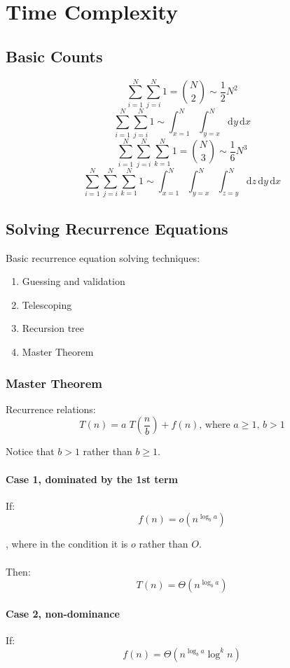 \chapter{Time Complexity}

\section{Basic Counts}
$$
\sum_{i=1}^N{\sum_{j=i}^N{1}} = {N \choose 2} \sim \frac{1}{2} N^2
$$
$$
\sum_{i=1}^N{\sum_{j=i}^N{1}} \sim \int_{x=1}^N \int_{y=x}^N  \mathrm{d}y\, \mathrm{d}x
$$
$$
\sum_{i=1}^N{\sum_{j=i}^N{\sum_{k=1}^N{1}}} = {N \choose 3} \sim \frac{1}{6} N^3
$$
$$
\sum_{i=1}^N{\sum_{j=i}^N{\sum_{k=1}^N{1}}} \sim \int_{x=1}^N \int_{y=x}^N \int_{z=y}^N \mathrm{d}z\,
\mathrm{d}y\, \mathrm{d}x
$$

\section{Solving Recurrence Equations}
Basic recurrence equation solving techniques:
\begin{enumerate}
\item Guessing and validation
\item Telescoping
\item Recursion tree
\item Master Theorem
\end{enumerate}

\subsection{Master Theorem}
Recurrence relations:
$$T(n) = a \; T\!\left(\frac{n}{b}\right) + f(n)\mbox{, where }a \geq 1 \mbox{, } b > 1$$

Notice that $b>1$ rather than $b\geq1$.

\subsubsection*{Case 1, dominated by the 1st term}
If:
$$f(n) = o(n^{\log_b a})$$

, where in the condition it is $o$ rather than $O$. \\\\
Then:
$$T(n) = \Theta(n^{\log_b a})$$
\subsubsection*{Case 2, non-dominance}
If:
$$f(n) = \Theta(n^{\log_b a} \log^{k} n)$$

